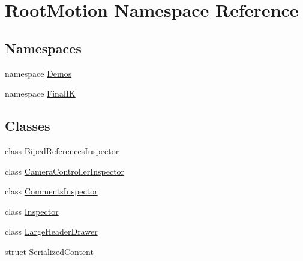 \hypertarget{namespace_root_motion}{}\section{Root\+Motion Namespace Reference}
\label{namespace_root_motion}
\subsection*{Namespaces}
\begin{DoxyCompactItemize}
\item 
namespace \mbox{\hyperlink{namespace_root_motion_1_1_demos}{Demos}}
\item 
namespace \mbox{\hyperlink{namespace_root_motion_1_1_final_i_k}{Final\+IK}}
\end{DoxyCompactItemize}
\subsection*{Classes}
\begin{DoxyCompactItemize}
\item 
class \mbox{\hyperlink{class_root_motion_1_1_biped_references_inspector}{Biped\+References\+Inspector}}
\item 
class \mbox{\hyperlink{class_root_motion_1_1_camera_controller_inspector}{Camera\+Controller\+Inspector}}
\item 
class \mbox{\hyperlink{class_root_motion_1_1_comments_inspector}{Comments\+Inspector}}
\item 
class \mbox{\hyperlink{class_root_motion_1_1_inspector}{Inspector}}
\item 
class \mbox{\hyperlink{class_root_motion_1_1_large_header_drawer}{Large\+Header\+Drawer}}
\item 
struct \mbox{\hyperlink{struct_root_motion_1_1_serialized_content}{Serialized\+Content}}
\end{DoxyCompactItemize}
